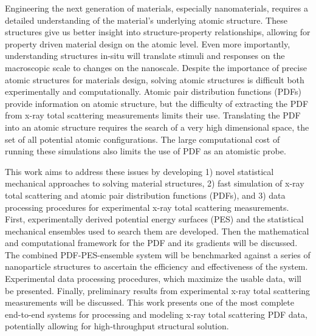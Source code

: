 Engineering the next generation of materials, especially nanomaterials, requires a detailed understanding of the material's underlying atomic structure.
These structures give us better insight into structure-property relationships, allowing for property driven material design on the atomic level.
Even more importantly, understanding structures in-situ will translate stimuli and responses on the macroscopic scale to changes on the nanoscale.
Despite the importance of precise atomic structures for materials design, solving atomic structures is difficult both experimentally and computationally.
Atomic pair distribution functions (PDFs) provide information on atomic structure, but the difficulty of extracting the PDF from x-ray total scattering measurements limits their use.
Translating the PDF into an atomic structure requires the search of a very high dimensional space, the set of all potential atomic configurations.
The large computational cost of running these simulations also limits the use of PDF as an atomistic probe.

This work aims to address these issues by developing 1) novel statistical mechanical approaches to solving material structures, 2)  fast simulation of x-ray total scattering and atomic pair distribution functions (PDFs), and 3) data processing procedures for experimental x-ray total scattering measurements.
First, experimentally derived potential energy surfaces (PES) and the statistical mechanical ensembles used to search them are developed.
Then the mathematical and computational framework for the PDF and its gradients will be discussed.
The combined PDF-PES-ensemble system will be benchmarked against a series of nanoparticle structures to ascertain the efficiency and effectiveness of the system.
Experimental data processing procedures, which maximize the usable data, will be presented.
Finally, preliminary results from experimental x-ray total scattering measurements will be discussed.
This work presents one of the most complete end-to-end systems for processing and modeling x-ray total scattering PDF data, potentially allowing for high-throughput structural solution.